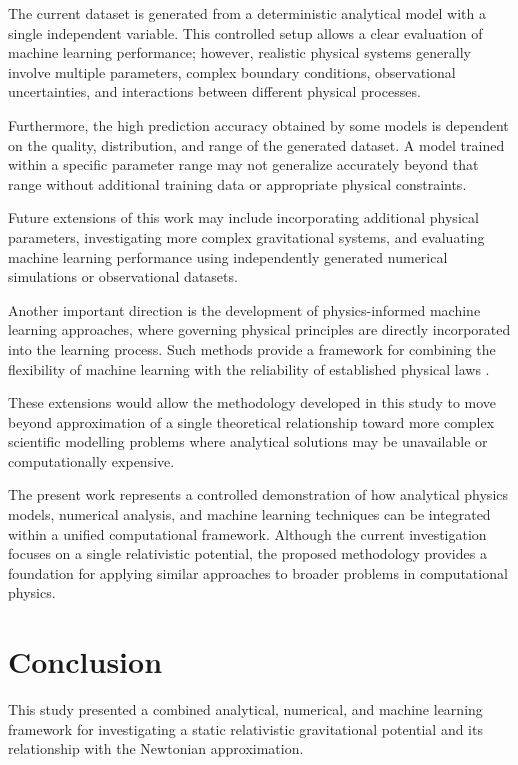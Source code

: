 \documentclass[
]{article}
\begin{document}
The current dataset is generated from a deterministic analytical model
with a single independent variable. This controlled setup allows a clear
evaluation of machine learning performance; however, realistic physical
systems generally involve multiple parameters, complex boundary
conditions, observational uncertainties, and interactions between
different physical processes.

Furthermore, the high prediction accuracy obtained by some models is
dependent on the quality, distribution, and range of the generated
dataset. A model trained within a specific parameter range may not
generalize accurately beyond that range without additional training
data or appropriate physical constraints.

Future extensions of this work may include incorporating additional
physical parameters, investigating more complex gravitational systems,
and evaluating machine learning performance using independently generated
numerical simulations or observational datasets.

Another important direction is the development of physics-informed
machine learning approaches, where governing physical principles are
directly incorporated into the learning process. Such methods provide a
framework for combining the flexibility of machine learning with the
reliability of established physical laws \cite{karniadakis2021}.

These extensions would allow the methodology developed in this study to
move beyond approximation of a single theoretical relationship toward
more complex scientific modelling problems where analytical solutions
may be unavailable or computationally expensive.

The present work represents a controlled demonstration of how
analytical physics models, numerical analysis, and machine learning
techniques can be integrated within a unified computational framework.
Although the current investigation focuses on a single relativistic
potential, the proposed methodology provides a foundation for applying
similar approaches to broader problems in computational physics.

\section{Conclusion}

This study presented a combined analytical, numerical, and machine
learning framework for investigating a static relativistic gravitational
potential and its relationship with the Newtonian approximation.
\end{document}
